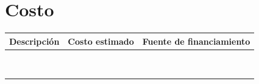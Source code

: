 \section{Costo}
\begin{center}
\begin{tabular}{|l|p{6cm}|p{6cm}|}
\hline
\rowcolor{gray}\textbf{Descripción}     & \textbf{Costo estimado} & \textbf{Fuente de financiamiento} \\\hline\hline
   &    &    \\\hline
    &    &    \\\hline
   &    &    \\ \hline
    &    &    \\\hline
    &    &    \\\hline
    &    &    \\ \hline
   &    &    \\\hline
    &    &    \\\hline
    &    &  \\\hline  
\end{tabular}
\end{center}
